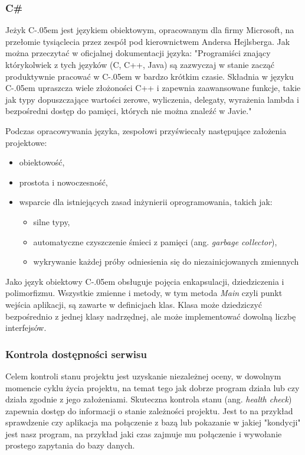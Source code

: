 \documentclass[12pt]{article}
\newcommand{\Csharp}{%
  {\settoheight{\dimen0}{C}C\kern-.05em \resizebox{!}{\dimen0}{\raisebox{\depth}{\# }}}}
\numberwithin{figure}{section}
\begin{document}
\begin{sloppypar}
\subsubsection{C\#}
Jeżyk \Csharp jest językiem obiektowym, opracowanym dla firmy Microsoft, na przełomie tysiąclecia przez zespół pod kierownictwem Andersa Hejlsberga. Jak można przeczytać w oficjalnej dokumentacji języka: 
"Programiści znający którykolwiek z tych języków (C, C++, Java) są zazwyczaj w stanie zacząć produktywnie pracować w \Csharp w bardzo krótkim czasie. Składnia w języku \Csharp upraszcza wiele złożoności C++ i zapewnia zaawansowane funkcje, takie jak typy dopuszczające wartości zerowe, wyliczenia, delegaty, wyrażenia lambda i bezpośredni dostęp do pamięci, których nie można znaleźć w Javie." \cite{csharp} 
    
Podczas opracowywania języka, zespołowi przyświecały następujące założenia projektowe:
\begin{itemize}
    \item obiektowość,
    \item prostota i nowoczesność,
    \item wsparcie dla istniejących zasad inżynierii oprogramowania, takich jak:
    \begin{itemize}
       \item silne typy,
       \item automatyczne czyszczenie śmieci z pamięci (ang. \textit{garbage collector}),
       \item wykrywanie każdej próby odniesienia się do niezainicjowanych zmiennych
    \end{itemize}
\end{itemize}
    
Jako język obiektowy \Csharp obsługuje pojęcia enkapsulacji, dziedziczenia i polimorfizmu. Wszystkie zmienne i metody, w tym metoda \textit{Main} czyli punkt wejścia aplikacji, są zawarte w definicjach klas. Klasa może dziedziczyć bezpośrednio z jednej klasy nadrzędnej, ale może implementować dowolną liczbę interfejsów.


\subsubsection{Kontrola dostępności serwisu}
Celem kontroli stanu projektu jest uzyskanie niezależnej oceny, w dowolnym momencie cyklu życia projektu, na temat tego jak dobrze program działa lub czy działa zgodnie z jego założeniami. Skuteczna kontrola stanu (ang. \textit{health check}) zapewnia dostęp do informacji o stanie zależności projektu. Jest to na przykład sprawdzenie czy aplikacja ma połączenie z bazą lub pokazanie w jakiej "kondycji" jest nasz program, na przykład jaki czas zajmuje mu połączenie i wywołanie prostego zapytania do bazy danych.
    

\end{sloppypar}
\end{document}
